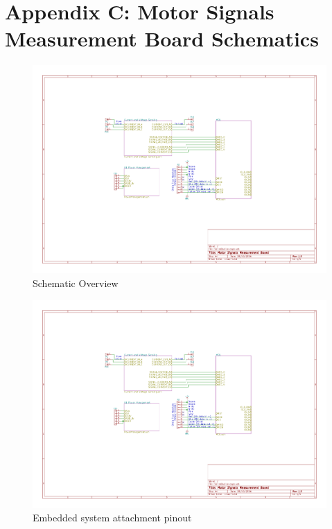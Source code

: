 \chapter{Appendix C: Motor Signals Measurement Board Schematics}\label{appendix:mmb_schematics}

\begin{figure}
    \includegraphics[width=\textwidth,page=1]{Images/mmb_sch}
    \caption{Schematic Overview}
    \label{fig:sch1_mmb}
\end{figure}

\begin{figure}
    \includegraphics[width=\textwidth,page=2]{Images/mmb_sch}
    \caption{Embedded system attachment pinout}
    \label{fig:sch2_mmb}
\end{figure}

